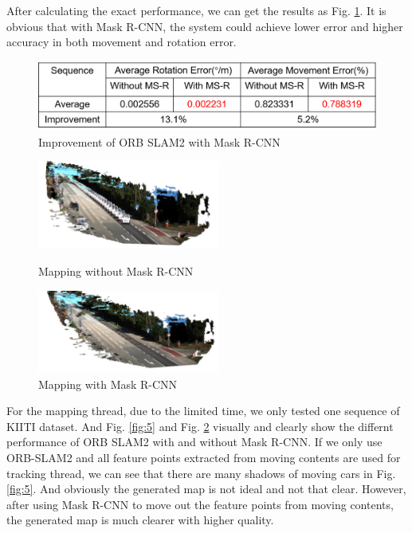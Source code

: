 \documentclass[letterpaper, 10 pt, conference]{IEEEtran}
\begin{document}
After calculating the exact performance, we can get the results as Fig.
\ref{fig:4}. It is obvious that with Mask R-CNN, the system could achieve lower
error and higher accuracy in both movement and rotation error. 
\begin{figure}[ht]
\includegraphics[scale=0.39]{images/Evaluation/FeatureRefine/versus2.png}
\caption{Improvement of ORB SLAM2 with Mask R-CNN}
\label{fig:4}
\end{figure}

\begin{figure}[htbp]
\centering
\begin{minipage}[t]{0.48\textwidth}
\centering
\includegraphics[width=6cm]
{images/Evaluation/FeatureRefine/Mappingwithoutmaskrcnn.png}
\caption{Mapping without Mask R-CNN}
\label{fig:5}
\end{minipage}
\begin{minipage}[t]{0.48\textwidth}
\centering
\includegraphics[width=6cm]
{images/Evaluation/FeatureRefine/mappingwithmaskrcnn.png}
\caption{Mapping with Mask R-CNN}
\label{fig:6}
\end{minipage}
\end{figure}

For the mapping thread, due to the limited time, we only tested one sequence of
KIITI dataset. And Fig. \ref{fig:5} and Fig. \ref{fig:6} visually and clearly
show the differnt performance of ORB SLAM2 with and without Mask R-CNN. If we
only use ORB-SLAM2 and all feature points extracted from moving contents are
used for tracking thread, we can see that there are many shadows of moving cars
in Fig. \ref{fig:5}. And obviously the generated map is not ideal and not that
clear. However, after using Mask R-CNN to move out the feature points from
moving contents, the generated map is much clearer with higher quality. 
\end{document}
